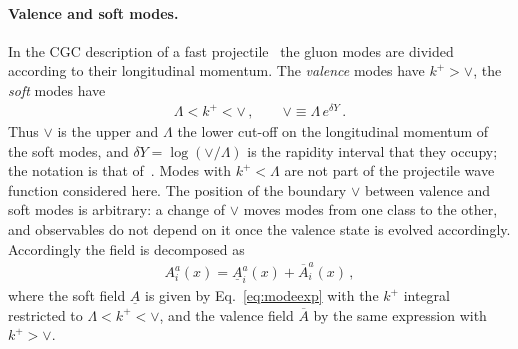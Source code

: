 \paragraph{Valence and soft modes.} In the CGC description of a fast projectile~\cite{McLerran:1993ni,McLerran:1993ka,Jalilian-Marian:1997jx,Kovner:2005en} the gluon modes are divided according to their longitudinal momentum. The \emph{valence} modes have $k^+>\vee$, the \emph{soft} modes have
\begin{align}\label{eq:softwindow}
\Lambda<k^+<\vee\,,\qquad \vee\equiv\Lambda\,e^{\delta Y}\,.
\end{align}
Thus $\vee$ is the upper and $\Lambda$ the lower cut-off on the longitudinal momentum of the soft modes, and $\delta Y=\log(\vee/\Lambda)$ is the rapidity interval that they occupy; the notation is that of~\cite{Lublinsky:2016meo}. Modes with $k^+<\Lambda$ are not part of the projectile wave function considered here. The position of the boundary $\vee$ between valence and soft modes is arbitrary: a change of $\vee$ moves modes from one class to the other, and observables do not depend on it once the valence state is evolved accordingly. Accordingly the field is decomposed as
\begin{align}\label{eq:Asplit}
A^a_i(x)=\underline A^a_i(x)+\overline A^a_i(x)\,,
\end{align}
where the soft field $\underline A$ is given by Eq.~\eqref{eq:modeexp} with the $k^+$ integral restricted to $\Lambda<k^+<\vee$, and the valence field $\overline A$ by the same expression with $k^+>\vee$.

